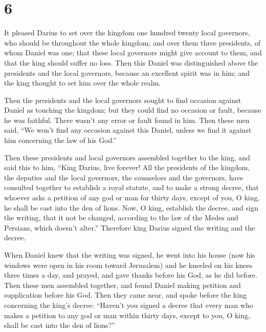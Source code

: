 \hypertarget{section-5}{%
\section{6}\label{section-5}}

 It pleased Darius to set over the kingdom one hundred
twenty local governors, who should be throughout the whole kingdom;
 and over them three presidents, of whom Daniel was one;
that these local governors might give account to them, and that the king
should suffer no loss.  Then this Daniel was distinguished
above the presidents and the local governors, because an excellent
spirit was in him; and the king thought to set him over the whole realm.

 Then the presidents and the local governors sought to
find occasion against Daniel as touching the kingdom; but they could
find no occasion or fault, because he was faithful. There wasn't any
error or fault found in him.  Then these men said, ``We
won't find any occasion against this Daniel, unless we find it against
him concerning the law of his God.''

 Then these presidents and local governors assembled
together to the king, and said this to him, ``King Darius, live forever!
 All the presidents of the kingdom, the deputies and the
local governors, the counselors and the governors, have consulted
together to establish a royal statute, and to make a strong decree, that
whoever asks a petition of any god or man for thirty days, except of
you, O king, he shall be cast into the den of lions.  Now,
O king, establish the decree, and sign the writing, that it not be
changed, according to the law of the Medes and Persians, which doesn't
alter.''  Therefore king Darius signed the writing and the
decree.

 When Daniel knew that the writing was signed, he went
into his house (now his windows were open in his room toward Jerusalem)
and he kneeled on his knees three times a day, and prayed, and gave
thanks before his God, as he did before.  Then these men
assembled together, and found Daniel making petition and supplication
before his God.  Then they came near, and spoke before
the king concerning the king's decree: ``Haven't you signed a decree
that every man who makes a petition to any god or man within thirty
days, except to you, O king, shall be cast into the den of lions?''

